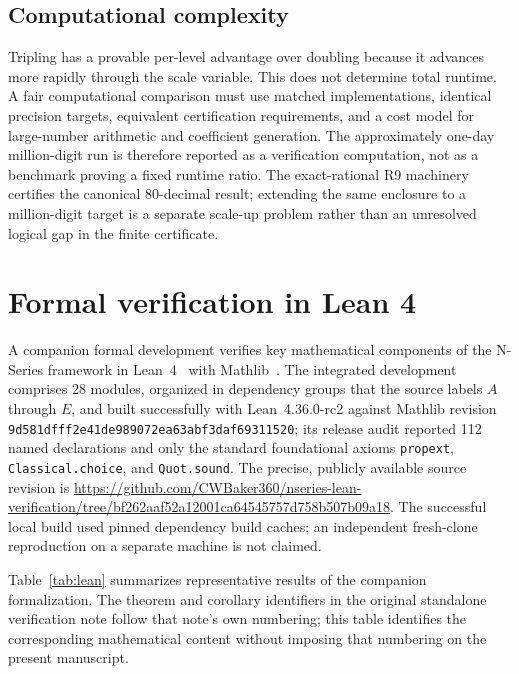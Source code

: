 \documentclass[12pt]{article}
\theoremstyle{definition}
\theoremstyle{remark}
\begin{document}
\subsection{Computational complexity}

Tripling has a provable per-level advantage over doubling because it advances
more rapidly through the scale variable.  This does not determine total runtime.
A fair computational comparison must use matched implementations, identical
precision targets, equivalent certification requirements, and a cost model for
large-number arithmetic and coefficient generation.  The approximately one-day
million-digit run is therefore reported as a verification computation, not as
a benchmark proving a fixed runtime ratio.  The exact-rational R9 machinery
certifies the canonical $80$-decimal result; extending the same enclosure to a
million-digit target is a separate scale-up problem rather than an unresolved
logical gap in the finite certificate.

\section{Formal verification in Lean 4}
\label{sec:lean}

A companion formal development verifies key mathematical components of the
N-Series framework in Lean~4~\cite{lean4} with Mathlib~\cite{mathlib}. The
integrated development comprises $28$ modules, organized in dependency groups
that the source labels $A$ through $E$, and
built successfully with Lean~4.36.0-rc2 against Mathlib revision
\texttt{9d581dfff2e41de989072ea63abf3daf69311520}; its release audit
reported 112 named declarations and only the standard foundational axioms
\texttt{propext}, \texttt{Classical.choice}, and \texttt{Quot.sound}.
The precise, publicly available source revision is
\url{https://github.com/CWBaker360/nseries-lean-verification/tree/bf262aaf52a12001ca64545757d758b507b09a18}.
The successful local build used pinned dependency build caches; an independent
fresh-clone reproduction on a separate machine is not claimed.

Table~\ref{tab:lean} summarizes representative results of the companion
formalization. The theorem and corollary identifiers in the original standalone
verification note follow that note's own numbering; this table identifies the
corresponding mathematical content without imposing that numbering on the
present manuscript.
\end{document}
